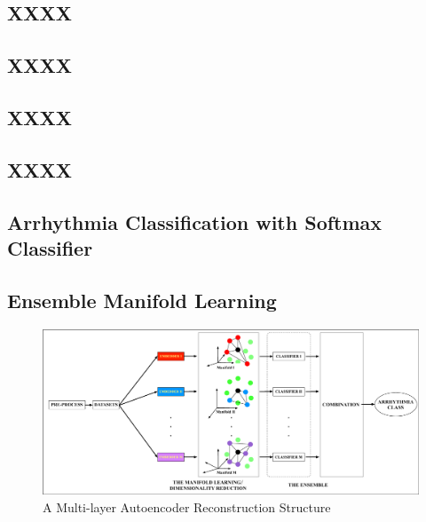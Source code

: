\documentclass[journal]{IEEEtran}
\begin{document}
%
%
\subsection{XXXX}
\lipsum[1-2]


%
%
\subsection{XXXX}
\lipsum[1-2]

%
%
\subsection{XXXX}
\lipsum[1-2]
%
%
\subsection{XXXX}
\lipsum[1-2]


%
%
\subsection{Arrhythmia Classification with Softmax Classifier}
\lipsum[1-2]


%
%

\subsection{Ensemble Manifold Learning}
\lipsum
\begin{figure}[!t]
\includegraphics[width=7in]{EPS/systemStructure.eps}
\caption{A Multi-layer Autoencoder Reconstruction Structure}
\end{figure}
\end{document}
